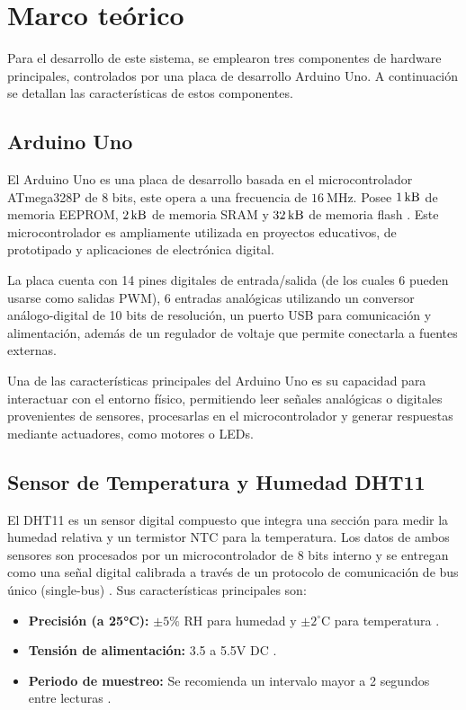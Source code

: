 \section{Marco teórico}
Para el desarrollo de este sistema, se emplearon tres componentes de hardware principales, controlados por una placa de desarrollo Arduino Uno. A continuación se detallan las características de estos componentes.
\subsection{Arduino Uno}
El Arduino Uno es una placa de desarrollo basada en el microcontrolador ATmega328P de $8$ bits, este opera a una
frecuencia de $\SI{16}{\mega \hertz}$. Posee $\SI{1}{\kilo \byte}$ de memoria EEPROM, $\SI{2}{\kilo \byte}$ de memoria 
SRAM y $\SI{32}{\kilo \byte}$ de memoria flash \cite{medina-arduino}. Este microcontrolador es ampliamente utilizada en proyectos educativos,
de prototipado y aplicaciones de electrónica digital.


La placa cuenta con 14 pines digitales de entrada/salida 
(de los cuales 6 pueden usarse como salidas PWM),
6 entradas analógicas utilizando un conversor análogo-digital de 10 bits de resolución, 
un puerto USB para comunicación y alimentación, 
además de un regulador de voltaje que permite conectarla a fuentes externas. 


Una de las características principales del Arduino Uno es su capacidad para interactuar con el entorno físico,
permitiendo leer señales analógicas o digitales provenientes de sensores, procesarlas en el microcontrolador 
y generar respuestas mediante actuadores, como motores o LEDs.

\subsection{Sensor de Temperatura y Humedad DHT11}

El DHT11 es un sensor digital compuesto que integra una sección para medir la humedad relativa y un termistor NTC para la temperatura. Los datos de ambos sensores son procesados por un microcontrolador de 8 bits interno y se entregan como una señal digital calibrada a través de un protocolo de comunicación de bus único (single-bus) \cite{dht11}.
Sus características principales son:

\begin{itemize}
    \item \textbf{Precisión (a 25°C):} $\pm5\%$ RH para humedad y $\pm2^{\circ}$C para temperatura \cite{dht11}.
    \item \textbf{Tensión de alimentación:} 3.5 a 5.5V DC \cite{dht11}.
    \item \textbf{Periodo de muestreo:} Se recomienda un intervalo mayor a 2 segundos entre lecturas \cite{dht11}.
\end{itemize}


